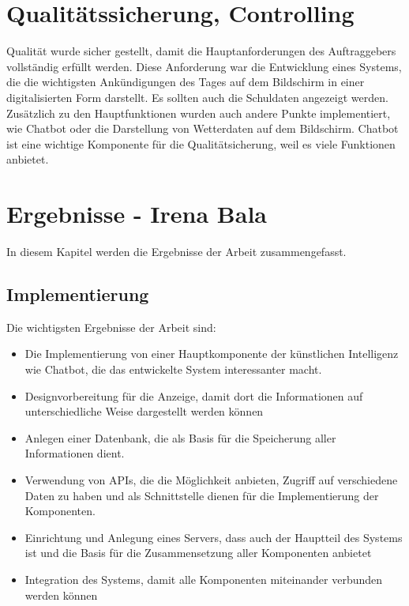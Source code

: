 \section{Qualitätssicherung, Controlling}
Qualität wurde sicher gestellt, damit die Hauptanforderungen des Auftraggebers vollständig erfüllt werden. Diese Anforderung war die Entwicklung eines Systems, die die wichtigsten Ankündigungen des Tages auf dem Bildschirm in einer digitalisierten Form darstellt. Es sollten auch die Schuldaten angezeigt werden. \\
Zusätzlich zu den Hauptfunktionen wurden auch andere Punkte implementiert, wie Chatbot oder die Darstellung von Wetterdaten auf dem Bildschirm. Chatbot ist eine wichtige Komponente für die Qualitätsicherung, weil es viele Funktionen anbietet. 

\section{Ergebnisse - Irena Bala}
In diesem Kapitel werden die Ergebnisse der Arbeit zusammengefasst.
\subsection{Implementierung}
Die wichtigsten Ergebnisse der Arbeit sind: 
\begin{itemize}
	\item Die Implementierung von einer Hauptkomponente der künstlichen Intelligenz wie Chatbot, die das entwickelte System interessanter macht. 
\end{itemize}
\begin{itemize}
	\item Designvorbereitung für die Anzeige, damit dort die Informationen auf unterschiedliche Weise dargestellt werden können
\end{itemize}
\begin{itemize}
	\item Anlegen einer Datenbank, die als Basis für die Speicherung aller Informationen dient.
\end{itemize}
\begin{itemize}
	\item Verwendung von APIs, die die Möglichkeit anbieten, Zugriff auf verschiedene Daten zu haben und als Schnittstelle dienen für die Implementierung der Komponenten.
\end{itemize}
\begin{itemize}
	\item 
	Einrichtung und Anlegung eines Servers, dass auch der Hauptteil des Systems ist und die Basis für die Zusammensetzung aller Komponenten anbietet
\end{itemize}
\begin{itemize}
	\item 
	Integration des Systems, damit alle Komponenten miteinander verbunden werden können
\end{itemize}
